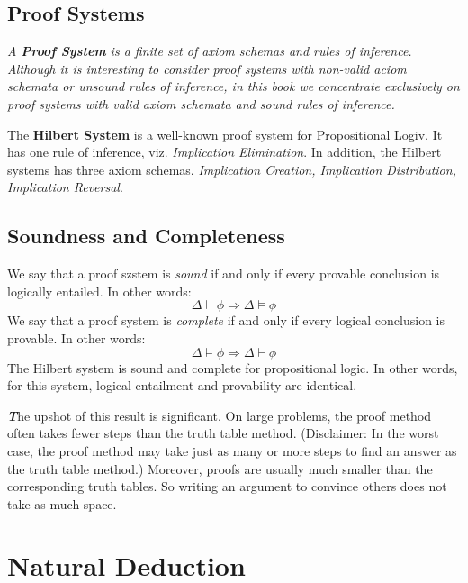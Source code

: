 \documentclass[10pt,a4pape,twocolumn]{article}
\newenvironment{callout}
	{\begin{calloutbox}\color{charcoal}\textbf\textit}
	{\end{calloutbox}}
\begin{document}
            \subsection{Proof Systems}
                \begin{define}
                    \textit{A \textbf{Proof System} is a finite set of axiom schemas and rules of inference. Although it is interesting to consider proof systems with non-valid aciom schemata or unsound rules of inference, in this book we concentrate exclusively on proof systems with valid axiom schemata and sound rules of inference.}
                \end{define}
                The \textbf{Hilbert System} is a well-known proof system for Propositional Logiv. It has one rule of inference, viz. \textit{Implication Elimination}. In addition, the Hilbert systems has three axiom schemas. \textit{Implication Creation, Implication Distribution, Implication Reversal}.
            \subsection{Soundness and Completeness}
                We say that a proof szstem is \textit{sound} if and only if every provable conclusion is logically entailed. In other words:
                \begin{equation}
                    \Delta \vdash \phi \Rightarrow \Delta \vDash \phi
                \end{equation}
                We say that a proof system is \textit{complete} if and only if every logical conclusion is provable. In other words:
                \begin{equation}
                    \Delta \vDash \phi \Rightarrow \Delta \vdash \phi
                \end{equation}
                The Hilbert system is sound and complete for propositional logic. In other words, for this system, logical entailment and provability are identical.
                \begin{callout}
                    The upshot of this result is significant. On large problems, the proof method often takes fewer steps than the truth table method. (Disclaimer: In the worst case, the proof method may take just as many or more steps to find an answer as the truth table method.) Moreover, proofs are usually much smaller than the corresponding truth tables. So writing an argument to convince others does not take as much space.
                \end{callout}
        \section{Natural Deduction}
\end{document}
